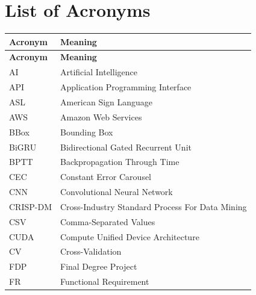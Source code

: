 \cleardoublepage
\chapter*{List of Acronyms}

\begingroup
    \renewcommand{\arraystretch}{1.25}
    \begin{longtable}{@{}p{3.0cm}p{10.5cm}@{}}
        \toprule
        \textbf{Acronym} & \textbf{Meaning}                                        \\
        \midrule
        \endfirsthead
        \toprule
        \textbf{Acronym} & \textbf{Meaning}                                        \\
        \midrule
        \endhead
        AI               & Artificial Intelligence                                 \\
        API              & Application Programming Interface                       \\
        ASL              & American Sign Language                                  \\
        AWS              & Amazon Web Services                                     \\
        BBox             & Bounding Box                                            \\
        BiGRU            & Bidirectional Gated Recurrent Unit                      \\
        BPTT             & Backpropagation Through Time                            \\
        CEC              & Constant Error Carousel                                 \\
        CNN              & Convolutional Neural Network                            \\
        CRISP-DM         & Cross-Industry Standard Process For Data Mining         \\
        CSV              & Comma-Separated Values                                  \\
        CUDA             & Compute Unified Device Architecture                     \\
        CV               & Cross-Validation                                        \\
        FDP              & Final Degree Project                                    \\
        FR               & Functional Requirement                                  \\

\end{longtable}
